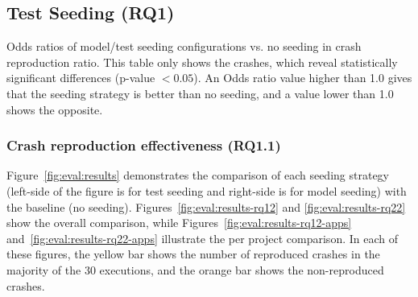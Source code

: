 \subsection{Test Seeding (RQ1)}




\begin{table}[t]
    \center
    \caption{Odds ratios of model/test seeding configurations vs. no seeding in crash reproduction ratio. This table only shows the crashes, which reveal statistically significant differences (p-value $< 0.05$). An Odds ratio value higher than 1.0 gives that the seeding strategy is better than no seeding, and a value lower than 1.0 shows the opposite.}
	\label{tab:oddratios}
	\footnotesize
	\subfloat{}
    \subfloat{}
\end{table}



\subsubsection{Crash reproduction effectiveness (\textbf{RQ1.1})}

Figure~\ref{fig:eval:results} demonstrates the comparison of each seeding strategy (left-side of the figure is for test seeding and right-side is for model seeding) with the baseline (no seeding). Figures~\ref{fig:eval:results-rq12} and \ref{fig:eval:results-rq22} show the overall comparison, while Figures~\ref{fig:eval:results-rq12-apps} and~\ref{fig:eval:results-rq22-apps} illustrate the per project comparison. In each of these figures, the yellow bar shows the number of reproduced crashes in the majority of the 30 executions, and the orange bar shows the non-reproduced crashes.

